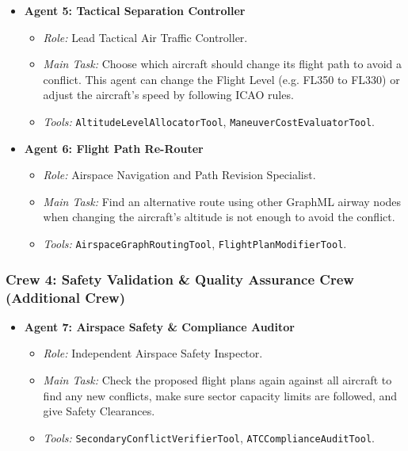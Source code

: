 \documentclass[12pt,a4paper]{article}
\begin{document}
\begin{itemize}[leftmargin=*]
    \item \textbf{Agent 5: Tactical Separation Controller}
    \begin{itemize}
        \item \textit{Role:} Lead Tactical Air Traffic Controller.
        \item \textit{Main Task:} Choose which aircraft should change its flight path to avoid a conflict. This agent can change the Flight Level (e.g. FL350 to FL330) or adjust the aircraft's speed by following ICAO rules.
        \item \textit{Tools:} \texttt{AltitudeLevelAllocatorTool}, \texttt{ManeuverCostEvaluatorTool}.
    \end{itemize}

    \item \textbf{Agent 6: Flight Path Re-Router}
    \begin{itemize}
        \item \textit{Role:} Airspace Navigation and Path Revision Specialist.
        \item \textit{Main Task:} Find an alternative route using other GraphML airway nodes when changing the aircraft's altitude is not enough to avoid the conflict.
        \item \textit{Tools:} \texttt{AirspaceGraphRoutingTool}, \texttt{FlightPlanModifierTool}.
    \end{itemize}
\end{itemize}


\subsubsection{Crew 4: Safety Validation \& Quality Assurance Crew (Additional Crew)}

\begin{itemize}[leftmargin=*]
    \item \textbf{Agent 7: Airspace Safety \& Compliance Auditor}
    \begin{itemize}
        \item \textit{Role:} Independent Airspace Safety Inspector.
        \item \textit{Main Task:} Check the proposed flight plans again against all aircraft to find any new conflicts, make sure sector capacity limits are followed, and give Safety Clearances.
        \item \textit{Tools:} \texttt{SecondaryConflictVerifierTool}, \texttt{ATCComplianceAuditTool}.
    \end{itemize}
\end{itemize}
\end{document}
